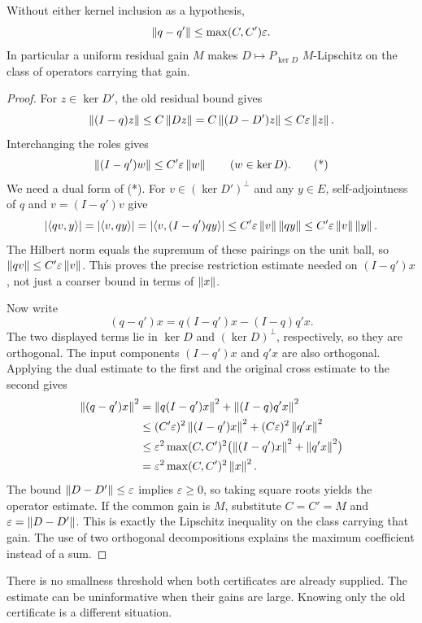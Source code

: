 \begin{KStheorem}\label{KS:KS48}
Without either kernel inclusion as a hypothesis,
\begin{equation}\label{KS:eq:motion}
 \left\lVert q-q'\right\rVert\le\max(C,C')\varepsilon.
\end{equation}
In particular a uniform residual gain \(M\) makes \(D\mapsto P_{\ker D}\) \(M\)-Lipschitz on the class of operators carrying that gain.
\end{KStheorem}
\begin{proof}
For $z\in\ker D'$, the old residual bound gives
\[
 \left\lVert(I-q)z\right\rVert\le C\left\lVert Dz\right\rVert
 =C\left\lVert(D-D')z\right\rVert\le C\varepsilon\left\lVert z\right\rVert.
\]
Interchanging the roles gives
\[
 \left\lVert(I-q')w\right\rVert\le C'\varepsilon\left\lVert w\right\rVert
 \qquad(w\in\ker D).                                      \tag{*}
\]
We need a dual form of (*). For $v\in(\ker D')^\perp$ and any $y\in E$, self-adjointness of $q$ and $v=(I-q')v$ give
\[
 |\langle qv,y\rangle|
 =|\langle v,qy\rangle|
 =|\langle v,(I-q')qy\rangle|
 \le C'\varepsilon\left\lVert v\right\rVert\left\lVert qy\right\rVert
 \le C'\varepsilon\left\lVert v\right\rVert\left\lVert y\right\rVert.
\]
The Hilbert norm equals the supremum of these pairings on the unit ball, so
$\left\lVert qv\right\rVert\le C'\varepsilon\left\lVert v\right\rVert$. This proves the precise restriction estimate needed on $(I-q')x$, not just a coarser bound in terms of $\left\lVert x\right\rVert$.

Now write
\[
 (q-q')x=q(I-q')x-(I-q)q'x.
\]
The two displayed terms lie in $\ker D$ and $(\ker D)^\perp$, respectively, so they are orthogonal. The input components $(I-q')x$ and $q'x$ are also orthogonal. Applying the dual estimate to the first and the original cross estimate to the second gives
\[
\begin{aligned}
 \left\lVert(q-q')x\right\rVert^2
 &=\left\lVert q(I-q')x\right\rVert^2+\left\lVert(I-q)q'x\right\rVert^2\\
 &\le (C'\varepsilon)^2\left\lVert(I-q')x\right\rVert^2
      +(C\varepsilon)^2\left\lVert q'x\right\rVert^2\\
 &\le\varepsilon^2\max(C,C')^2
       \bigl(\left\lVert(I-q')x\right\rVert^2+\left\lVert q'x\right\rVert^2\bigr)\\
 &=\varepsilon^2\max(C,C')^2\left\lVert x\right\rVert^2.
\end{aligned}
\]
The bound $\left\lVert D-D'\right\rVert\le\varepsilon$ implies $\varepsilon\ge0$, so taking square roots yields the operator estimate. If the common gain is $M$, substitute $C=C'=M$ and $\varepsilon=\left\lVert D-D'\right\rVert$. This is exactly the Lipschitz inequality on the class carrying that gain. The use of two orthogonal decompositions explains the maximum coefficient instead of a sum.
\end{proof}
There is no smallness threshold when both certificates are already supplied. The estimate can be uninformative when their gains are large. Knowing only the old certificate is a different situation.


